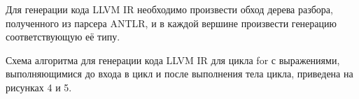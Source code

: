 Для генерации кода LLVM IR необходимо произвести обход дерева разбора, полученного из парсера ANTLR, и в каждой вершине произвести генерацию соответствующую её типу.

Схема алгоритма для генерации кода LLVM IR для цикла for с выражениями, выполняющимися до входа в цикл и после выполнения тела цикла, приведена на рисунках 4 и 5.




